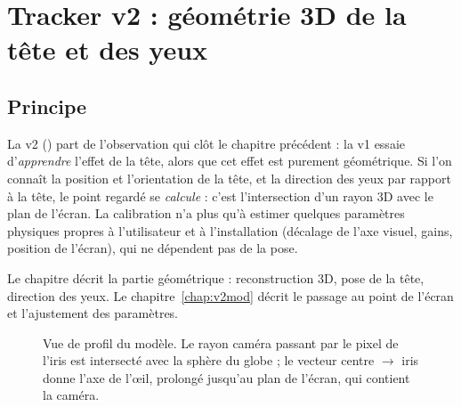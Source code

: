\chapter{Tracker v2 : géométrie 3D de la tête et des yeux}
\label{chap:v2geo}

\section{Principe}

La v2 () part de l'observation qui clôt le chapitre précédent : la v1 essaie d'\emph{apprendre} l'effet de la tête, alors que cet effet est purement géométrique. Si l'on connaît la position et l'orientation de la tête, et la direction des yeux par rapport à la tête, le point regardé se \emph{calcule} : c'est l'intersection d'un rayon 3D avec le plan de l'écran. La calibration n'a plus qu'à estimer quelques paramètres physiques propres à l'utilisateur et à l'installation (décalage de l'axe visuel, gains, position de l'écran), qui ne dépendent pas de la pose.

Le chapitre décrit la partie géométrique : reconstruction 3D, pose de la tête, direction des yeux. Le chapitre~\ref{chap:v2mod} décrit le passage au point de l'écran et l'ajustement des paramètres.

\begin{figure}[H]
\centering
{}
\caption{Vue de profil du modèle. Le rayon caméra passant par le pixel de l'iris est intersecté avec la sphère du globe ; le vecteur centre $\to$ iris donne l'axe de l'œil, prolongé jusqu'au plan de l'écran, qui contient la caméra.}
\label{fig:geometrie}
\end{figure}

